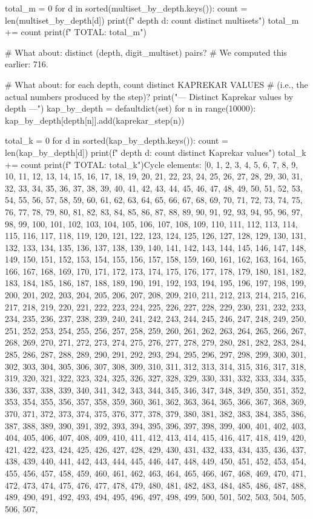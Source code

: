 {{{{{{{{{{{{{total_m = 0
for d in sorted(multiset_by_depth.keys()):
    count = len(multiset_by_depth[d])
    print(f"  depth {d}: {count} distinct multisets")
    total_m += count
print(f"  TOTAL: {total_m}")

# What about: distinct (depth, digit_multiset) pairs?
# We computed this earlier: 716.

# What about: for each depth, count distinct KAPREKAR VALUES
# (i.e., the actual numbers produced by the step)?
print("\n--- Distinct Kaprekar values by depth ---")
kap_by_depth = defaultdict(set)
for n in range(10000):
    kap_by_depth[depth[n]].add(kaprekar_step(n))

total_k = 0
for d in sorted(kap_by_depth.keys()):
    count = len(kap_by_depth[d])
    print(f"  depth {d}: {count} distinct Kaprekar values")
    total_k += count
print(f"  TOTAL: {total_k}")Cycle elements: [0, 1, 2, 3, 4, 5, 6, 7, 8, 9, 10, 11, 12, 13, 14, 15, 16, 17, 18, 19, 20, 21, 22, 23, 24, 25, 26, 27, 28, 29, 30, 31, 32, 33, 34, 35, 36, 37, 38, 39, 40, 41, 42, 43, 44, 45, 46, 47, 48, 49, 50, 51, 52, 53, 54, 55, 56, 57, 58, 59, 60, 61, 62, 63, 64, 65, 66, 67, 68, 69, 70, 71, 72, 73, 74, 75, 76, 77, 78, 79, 80, 81, 82, 83, 84, 85, 86, 87, 88, 89, 90, 91, 92, 93, 94, 95, 96, 97, 98, 99, 100, 101, 102, 103, 104, 105, 106, 107, 108, 109, 110, 111, 112, 113, 114, 115, 116, 117, 118, 119, 120, 121, 122, 123, 124, 125, 126, 127, 128, 129, 130, 131, 132, 133, 134, 135, 136, 137, 138, 139, 140, 141, 142, 143, 144, 145, 146, 147, 148, 149, 150, 151, 152, 153, 154, 155, 156, 157, 158, 159, 160, 161, 162, 163, 164, 165, 166, 167, 168, 169, 170, 171, 172, 173, 174, 175, 176, 177, 178, 179, 180, 181, 182, 183, 184, 185, 186, 187, 188, 189, 190, 191, 192, 193, 194, 195, 196, 197, 198, 199, 200, 201, 202, 203, 204, 205, 206, 207, 208, 209, 210, 211, 212, 213, 214, 215, 216, 217, 218, 219, 220, 221, 222, 223, 224, 225, 226, 227, 228, 229, 230, 231, 232, 233, 234, 235, 236, 237, 238, 239, 240, 241, 242, 243, 244, 245, 246, 247, 248, 249, 250, 251, 252, 253, 254, 255, 256, 257, 258, 259, 260, 261, 262, 263, 264, 265, 266, 267, 268, 269, 270, 271, 272, 273, 274, 275, 276, 277, 278, 279, 280, 281, 282, 283, 284, 285, 286, 287, 288, 289, 290, 291, 292, 293, 294, 295, 296, 297, 298, 299, 300, 301, 302, 303, 304, 305, 306, 307, 308, 309, 310, 311, 312, 313, 314, 315, 316, 317, 318, 319, 320, 321, 322, 323, 324, 325, 326, 327, 328, 329, 330, 331, 332, 333, 334, 335, 336, 337, 338, 339, 340, 341, 342, 343, 344, 345, 346, 347, 348, 349, 350, 351, 352, 353, 354, 355, 356, 357, 358, 359, 360, 361, 362, 363, 364, 365, 366, 367, 368, 369, 370, 371, 372, 373, 374, 375, 376, 377, 378, 379, 380, 381, 382, 383, 384, 385, 386, 387, 388, 389, 390, 391, 392, 393, 394, 395, 396, 397, 398, 399, 400, 401, 402, 403, 404, 405, 406, 407, 408, 409, 410, 411, 412, 413, 414, 415, 416, 417, 418, 419, 420, 421, 422, 423, 424, 425, 426, 427, 428, 429, 430, 431, 432, 433, 434, 435, 436, 437, 438, 439, 440, 441, 442, 443, 444, 445, 446, 447, 448, 449, 450, 451, 452, 453, 454, 455, 456, 457, 458, 459, 460, 461, 462, 463, 464, 465, 466, 467, 468, 469, 470, 471, 472, 473, 474, 475, 476, 477, 478, 479, 480, 481, 482, 483, 484, 485, 486, 487, 488, 489, 490, 491, 492, 493, 494, 495, 496, 497, 498, 499, 500, 501, 502, 503, 504, 505, 506, 507, }}}}}}}}}}}}}
